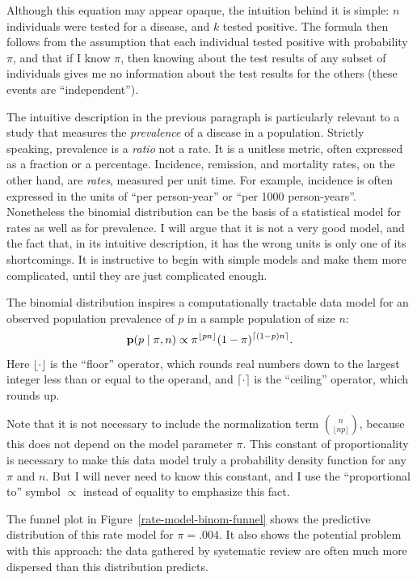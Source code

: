 Although this equation may appear opaque, the intuition behind it is
simple: $n$ individuals were tested for a disease, and $k$ tested
positive. The formula then follows from the assumption that each
individual tested positive with probability $\pi$, and that if I know
$\pi$, then knowing about the test results of any subset of
individuals gives me no information about the test results for the
others (these events are ``independent'').

The intuitive description in the previous paragraph is particularly
relevant to a study that measures the \emph{prevalence} of a disease
in a population.  Strictly speaking, prevalence is a \emph{ratio} not
a rate.  It is a unitless metric, often expressed as a fraction or a
percentage.  Incidence, remission, and mortality rates, on the other
hand, are \emph{rates}, measured per unit time.  For example,
incidence is often expressed in the units of ``per person-year'' or
``per 1000 person-years''.  Nonetheless the binomial distribution can
be the basis of a statistical model for rates as well as for
prevalence.  I will argue that it is not a very good model, and the
fact that, in its intuitive description, it has the wrong units is
only one of its shortcomings.  It is instructive to
begin with simple models and make them more complicated, until they
are just complicated enough.

The binomial distribution inspires a computationally tractable
data model for an observed population prevalence of
$p$ in a sample population of size $n$:
\[
\mathbf{p}(p\;|\; \pi, n) \propto \pi^{\lfloor pn \rfloor}(1-\pi)^{\lceil (1-p)n \rceil}.
\]
Here $\lfloor \cdot \rfloor$ is the ``floor'' operator, which rounds
real numbers down to the largest integer less than or equal to the
operand, and $\lceil \cdot \rceil$ is the ``ceiling'' operator, which
rounds up.

Note that it is not necessary to include the normalization term
$\binom{n}{\lfloor np\rfloor}$, because this does not depend on the
model parameter $\pi$. This constant of proportionality is necessary
to make this data model truly a probability density function for any
$\pi$ and $n$. But I will never need to know this constant, and I use
the ``proportional to'' symbol $\propto$ instead of equality to
emphasize this fact.

The funnel plot in Figure~\ref{rate-model-binom-funnel} shows the
predictive distribution of this rate model for $\pi=.004$.  It also
shows the potential problem with this approach: the data gathered by
systematic review are often much more dispersed than this distribution
predicts.

